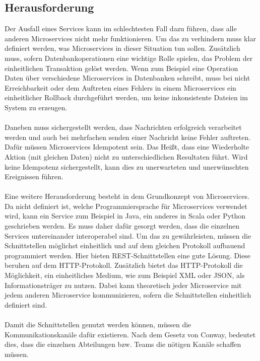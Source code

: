 \subsection{Herausforderung}
\label{sec:Herausforderung}
Der Ausfall eines Services kann im schlechtesten Fall dazu führen, dass alle anderen Microservices nicht mehr funktionieren. Um das zu verhindern muss klar definiert werden, was Microservices in dieser Situation tun sollen. Zusätzlich muss, sofern Datenbankoperationen eine wichtige Rolle spielen, das Problem der einheitlichen Transaktion gelöst werden. Wenn zum Beispiel eine Operation Daten über verschiedene Microservices in Datenbanken schreibt, muss bei nicht Erreichbarkeit oder dem Auftreten eines Fehlers in einem Microservices ein einheitlicher Rollback durchgeführt werden, um keine inkonsistente Dateien im System zu erzeugen.
\\\\
Daneben muss sichergestellt werden, dass Nachrichten erfolgreich verarbeitet werden und auch bei mehrfachen senden einer Nachricht keine Fehler auftreten. Dafür müssen Microservices Idempotent sein. Das Heißt, dass eine Wiederholte Aktion (mit gleichen Daten) nicht zu unterschiedlichen Resultaten führt. Wird keine Idempotenz sichergestellt, kann dies zu unerwarteten und unerwünschten Ereignissen führen.
\\\\
Eine weitere Herausforderung besteht in dem Grundkonzept von Microservices. Da nicht definiert ist, welche Programmiersprache für Microservices verwendet wird, kann ein Service zum Beispiel in Java, ein anderes in Scala oder Python geschrieben werden. Es muss daher dafür gesorgt werden, dass die einzelnen Services untereinander interoperabel sind. Um das zu gewährleisten, müssen die Schnittstellen möglichst einheitlich und auf dem gleichen Protokoll aufbauend programmiert werden. Hier bieten REST-Schnittstellen eine gute Lösung. Diese beruhen auf dem HTTP-Protokoll. Zusätzlich bietet das HTTP-Protokoll die Möglichkeit, ein einheitliches Medium, wie zum Beispiel XML oder JSON, als Informationsträger zu nutzen. Dabei kann theoretisch jeder Microservice mit jedem anderen Microservice kommunizieren, sofern die Schnittstellen einheitlich definiert sind.
\\\\
Damit die Schnittstellen genutzt werden können, müssen die Kommunikationskanäle dafür existieren. Nach dem Gesetz von Conway, bedeutet dies, dass die einzelnen Abteilungen bzw. Teams die nötigen Kanäle schaffen müssen.
\newpage
